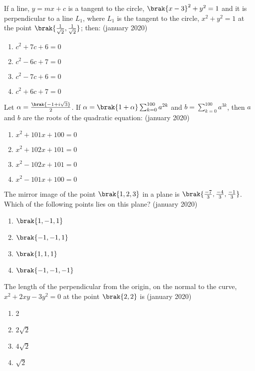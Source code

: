     \item If a line, $y= mx + c$ is a tangent to the circle, $\brak{x - 3}^2 + y^2 = 1$ and it is perpendicular to a line $L_1$, where $L_1$ is the tangent to the circle, $x^2 + y^2 = 1$ at the point $\brak{ \frac{1}{\sqrt{2}} , \frac{1}{\sqrt{2}}}$; then:
  \hfill{(january 2020)}
  \begin{enumerate}
        \item $c^2 + 7c + 6 = 0 $
        \item $c^2 - 6c + 7 = 0 $
        \item $c^2 - 7c + 6 = 0 $
        \item $c^2 + 6c + 7 = 0 $
    \end{enumerate}
    \item Let $\alpha=\frac{\brak{-1+i\sqrt{3}}}{2}$. If $\alpha=\brak{1+\alpha}\sum_{k=0}^{100}a^{2k}$ and $b=\sum_{k=0}^{100} a^{3k}$, then $a$ and $b$ are the roots of the quadratic equation:
  \hfill{(january 2020)}
  \begin{enumerate}
        \item $x^2+101x+100=0$
        \item $x^2+102x+101=0$
        \item $x^2-102x+101=0$
        \item $x^2-101x+100=0$
    \end{enumerate}
    \item  The mirror image of the point $\brak{1, 2, 3}$ in a plane is $\brak{\frac{-7}{3}, \frac{-4}{3} , \frac{-1}{3} }$. Which of the following points lies on this plane?
\hfill{(january 2020)}
    \begin{enumerate}
        \item $\brak{1,-1,1}$
         \item $\brak{-1,-1,1}$
          \item $\brak{1,1,1}$
         \item $\brak{-1,-1,-1}$  
    \end{enumerate}
    \item The length of the perpendicular from the origin, on the normal to the curve,$x^2 + 2xy - 3y^2 = 0$ at the point $\brak{2, 2}$ is
\hfill{(january 2020)}
    \begin{enumerate}
        \item 2
        \item $2\sqrt{2}$
        \item $4\sqrt{2}$
        \item $\sqrt{2}$
    \end{enumerate}
